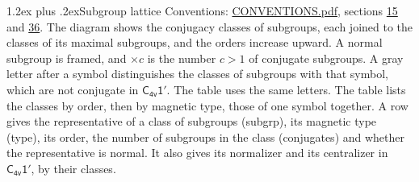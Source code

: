 \documentclass[10pt,a4paper]{article}
\makeatletter
\renewcommand\section{\@startsection{section}{1}{\z@}{-3ex plus -1ex minus -.2ex}%
  {1.2ex plus .2ex}{\normalfont\large\sffamily\bfseries\color{parttitle}}}
\numberwithin{equation}{section}
\newcommand{\grp}[1]{\mathsf{#1}}
\makeatother
\begin{document}
\section{Subgroup lattice}\label{s:subgroups}
Conventions: \href{../../CONVENTIONS.pdf}{CONVENTIONS.pdf}, sections \href{../../../rotation/CONVENTIONS.pdf\#conv.15}{15} and \href{../../CONVENTIONS.pdf\#conv.36}{36}.
The diagram shows the conjugacy classes of subgroups, each joined to the classes of its maximal subgroups, and the orders increase upward. \label{n:index.conjugates.c}\label{n:mark.conjugates}A normal subgroup is framed, and ${\times}c$ is the number $c > 1$ of conjugate subgroups. \label{n:mark.letter}A gray letter after a symbol distinguishes the classes of subgroups with that symbol, which are not conjugate in $\grp{C_{4v}1'}$. The table uses the same letters. The table lists the classes by order, then by magnetic type, those of one symbol together. \label{n:head.subgroup}\label{n:head.magnetic.type}\label{n:head.order}\label{n:head.conjugates}\label{n:head.normal}A row gives the representative of a class of subgroups (subgrp), its magnetic type (type), its order, the number of subgroups in the class (conjugates) and whether the representative is normal. \label{n:head.normalizer}\label{n:head.centralizer}It also gives its normalizer and its centralizer in $\grp{C_{4v}1'}$, by their classes. 
\end{document}
